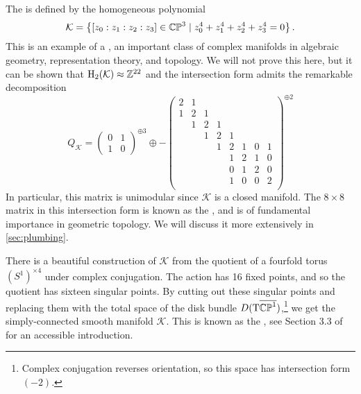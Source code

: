 \begin{example}\label{example:k3}
	The  is defined by the homogeneous polynomial
	\[
		\mathcal{K} = \left\{ [z_0 : z_1 : z_2 : z_3]\in \mathbb{CP}^3 \mid z_0^4 + z_1^4+z_2^4 + z_3^4=0\right\}.
	\]
	This is an example of a , an important class of complex manifolds in algebraic geometry, representation theory, and topology. 
	We will not prove this here, but it can be shown that $\operatorname{H}_2(\mathcal{K})\approx \mathbb{Z}^{22}$ and the intersection form admits the remarkable decomposition
	\[
		Q_{\mathcal{K}} = 
		\begin{pmatrix}
			0 & 1\\ 1 & 0
		\end{pmatrix}^{\oplus 3}\oplus
		-\begin{pmatrix}
			2 & 1 &   &   &   &   &   &   \\
			1 & 2 & 1 &   &   &   &   &   \\
			  & 1 & 2 & 1 &   &   &   &   \\
			  &   & 1 & 2 & 1 &   &   &   \\
			  &   &   & 1 & 2 & 1 & 0 & 1 \\
			  &   &   &   & 1 & 2 & 1 & 0 \\
			  &   &   &   & 0 & 1 & 2 & 0 \\
			  &   &   &   & 1 & 0 & 0 & 2 \\
		\end{pmatrix}^{\oplus 2}
	\]
	In particular, this matrix is unimodular since $\mathcal{K}$ is a closed manifold. The $8\times 8$ matrix in this intersection form is known as the , and is of fundamental importance in geometric topology. We will discuss it more extensively in \cref{sec:plumbing}.
\end{example}

\begin{remark}\label{rmk:kummer-construction}
	There is a beautiful construction of $\mathcal{K}$ from the quotient of a fourfold torus $(S^1)^{\times 4}$ under complex conjugation. The action has 16 fixed points, and so the quotient has sixteen singular points. By cutting out these singular points and replacing them with the total space of the disk bundle ${D}(\mathrm{T} \overline{\mathbb{CP}^1})$,\footnote{Complex conjugation reverses orientation, so this space has intersection form $(-2)$.} we get the simply-connected smooth manifold $\mathcal{K}$. This is known as the , see Section 3.3 of \cite{scorpan2005wild} for an accessible introduction.
\end{remark}

